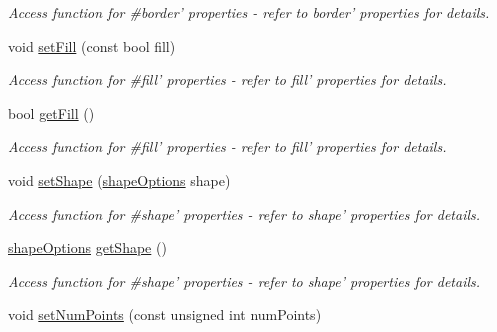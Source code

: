 \begin{DoxyCompactItemize}
\begin{DoxyCompactList}\small\item\em Access function for \#border' properties -\/ refer to border' properties for details. \end{DoxyCompactList}\item 
\hypertarget{classQEShape_a16abd3c4386f5001983abfff568fc30c}{
void \hyperlink{classQEShape_a16abd3c4386f5001983abfff568fc30c}{setFill} (const bool fill)}
\label{classQEShape_a16abd3c4386f5001983abfff568fc30c}

\begin{DoxyCompactList}\small\item\em Access function for \#fill' properties -\/ refer to fill' properties for details. \end{DoxyCompactList}\item 
\hypertarget{classQEShape_a96e046e066b37252514ea42dba7ad05d}{
bool \hyperlink{classQEShape_a96e046e066b37252514ea42dba7ad05d}{getFill} ()}
\label{classQEShape_a96e046e066b37252514ea42dba7ad05d}

\begin{DoxyCompactList}\small\item\em Access function for \#fill' properties -\/ refer to fill' properties for details. \end{DoxyCompactList}\item 
\hypertarget{classQEShape_a8423a74b197733cfffec0bce07169c4c}{
void \hyperlink{classQEShape_a8423a74b197733cfffec0bce07169c4c}{setShape} (\hyperlink{classQEShape_a159b98721912181fdf5e3014173558ef}{shapeOptions} shape)}
\label{classQEShape_a8423a74b197733cfffec0bce07169c4c}

\begin{DoxyCompactList}\small\item\em Access function for \#shape' properties -\/ refer to shape' properties for details. \end{DoxyCompactList}\item 
\hypertarget{classQEShape_a155a3989112f456587e51057d411f32a}{
\hyperlink{classQEShape_a159b98721912181fdf5e3014173558ef}{shapeOptions} \hyperlink{classQEShape_a155a3989112f456587e51057d411f32a}{getShape} ()}
\label{classQEShape_a155a3989112f456587e51057d411f32a}

\begin{DoxyCompactList}\small\item\em Access function for \#shape' properties -\/ refer to shape' properties for details. \end{DoxyCompactList}\item 
\hypertarget{classQEShape_a539f21747b5ab4bcda1bd9c1566e5d64}{
void \hyperlink{classQEShape_a539f21747b5ab4bcda1bd9c1566e5d64}{setNumPoints} (const unsigned int numPoints)}
\label{classQEShape_a539f21747b5ab4bcda1bd9c1566e5d64}


\end{DoxyCompactItemize}
